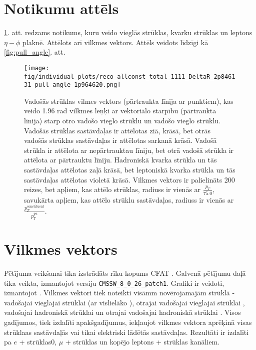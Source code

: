 \label{chap:results}
\section{Notikumu attēls}
\ref{fig:event_display}. att. redzams notikums, kuru veido vieglās strūklas, \cPqb kvarku strūklas un leptons $\eta-\phi$ plaknē. Attēlots arī vilkmes vektors. Attēls veidots līdzīgi kā \ref{fig:pull_angle}. att.

\begin{figure}[hbtp]
  \centering
  \texttt{[image: fig/individual\_plots/reco\_allconst\_total\_1111\_DeltaR\_2p846131\_pull\_angle\_1p964620.png]}
  \caption{Vadošās strūklas vilmes vektors (pārtraukta līnija ar punktiem), kas veido 1.96 rad vilkmes leņķi ar vektoriālo starpību (pārtraukta līnija) starp otro vadošo vieglo strūklu un vadošo vieglo strūklu. Vadošās strūklas sastāvdaļas ir attēlotas ziā, krāsā, bet otrās vadošās strūklas sastāvdaļas ir attēlotas sarkanā krāsā. Vadošā strūkla ir attēlota ar nepārtrauktau līniju, bet otrā vadošā strūkla ir attēlota ar pārtrauktu līniju. Hadroniskā \cPqb kvarka strūkla un tās sastāvdaļas attēlotas zaļā krāsā, bet leptoniskā \cPqb kvarka strūkla un tās sastāvdaļas attēlotas violetā krāsā. Vilkmes vektors ir palielināts 200 reizes, bet apļiem, kas attēlo strūklas, radiuss ir vienās ar $\frac{p_{T}}{75.0}$, savukārta apļiem, kas attēlo strūklu sastāvdaļas, radiuss ir vienās ar $\frac{p^{\text{constituent}}_{T}}{p^{\text{jet}}_{T}}$.}
  \label{fig:event_display}
\end{figure}

\section{Vilkmes vektors}

Pētījuma veikšanai tika izstrādāts rīku kopums \textsc{CFAT} \cite{url:cfat}. Galvenā pētījumu daļā tika veikta, izmantojot \CMSSW versiju \lstinline[language=sh]|CMSSW_8_0_26_patch1|. Grafiki ir veidoti, izmantojot \ROOT \cite{Brun}. Vilkmes vektori tiek noteikti visāmm novērojamajām strūklā - vadošajai vieglajai strūklai \leadingjet (ar vislielāko \pt), otrajai vadošajai vieglajai strūklai \scndleadingjet, vadošajai hadroniskā \cPqb strūklai \leadingb un otrajai vadošajai hadroniskā \cPqb strūklai \scndleadingb. Visos gadījumos, tiek izdalīti apakšgadījumus, iekļaujot vilkmes vektora aprēķinā visas strūklaas sastāvdaļās vai tikai elektriski lādētās sastāvdaļas. Rezultāti ir izdalīti pa $e$ + strūklas0, $\mu$ + strūklas un kopējo leptons + strūklas kanāliem.

